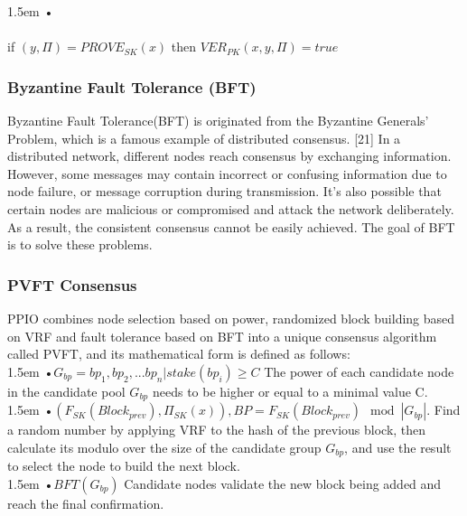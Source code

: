 \documentclass[10pt,a4paper]{article}
\begin{document}
\hangindent 1.5em
\noindent   
•
\vspace{-0.8em}
\\ \\if $(y, \Pi)=PROVE_{SK}(x)$ then $VER_{PK}(x, y, \Pi)= true$
\vspace{-0.7em}
        \subsubsection{Byzantine Fault Tolerance (BFT)}  %
Byzantine Fault Tolerance(BFT) is originated from the Byzantine Generals' Problem, which is a famous example of distributed consensus. [21] In a distributed network, different nodes reach consensus by exchanging information. However, some messages may contain incorrect or confusing information due to node failure, or message corruption during transmission. It's also possible that certain nodes are malicious or compromised and attack the network deliberately. As a result, the consistent consensus cannot be easily achieved.  The goal of BFT is to solve these problems.
\vspace{-0.5em}
        \subsubsection{PVFT Consensus}  %
PPIO combines node selection based on power, randomized block building based on VRF and fault tolerance based on BFT into a unique consensus algorithm called PVFT, and its mathematical form is defined as follows:      
\vspace{-0.8em}
\\

\hangindent 1.5em
\noindent   
•\quad $G_{bp}={bp_{1}, bp_{2},...bp_{n}|stake(bp_{i})\geqslant C}$ The power of each candidate node in the candidate pool $G_{bp}$ needs to be higher or equal to a minimal value C.
\vspace{-0.8em}
\\

\hangindent 1.5em
\noindent   
•\quad $(F_{SK}(Block_{prev}), \Pi_{SK}(x)),BP=F_{SK}(Block_{prev}) \mod |G_{bp}|$. Find a random number by applying VRF to the hash of the previous block, then calculate its modulo over the size of the candidate group $G_{bp}$, and use the result to select the node to build the next block.
\vspace{-0.8em}
\\

\hangindent 1.5em
\noindent   
•\quad $BFT(G_{bp})$ Candidate nodes validate the new block being added and reach the final confirmation.
\vspace{-0.5em}
\end{document}
